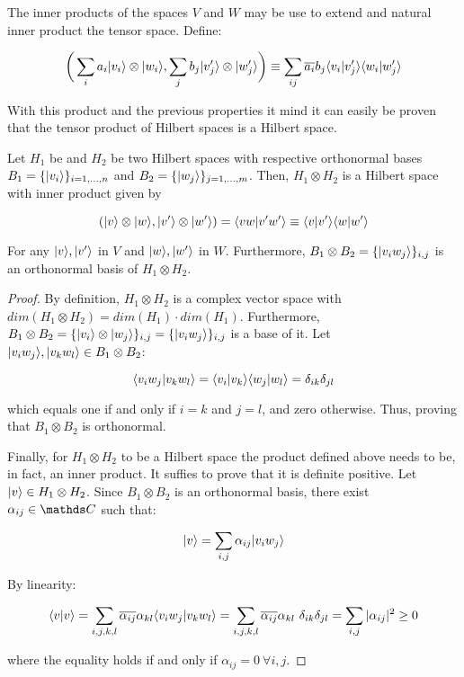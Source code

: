 The inner products of the spaces $V$ and $W$ may be use to extend and natural inner product the tensor space. Define:

$$ \bigg ( \sum_i a_i |v_i\rangle \otimes |w_i\rangle, \sum_j b_j |v_j'\rangle \otimes |w_j'\rangle \bigg ) \equiv
		\sum_{ij} \overline{a_i} b_j \langle v_i|v_j' \rangle \langle w_i|w_j' \rangle $$

With this product and the previous properties it mind it can easily be proven that the tensor product of Hilbert spaces is a Hilbert space.

\begin{proposition}
	Let $H_1$ be and $H_2$ be two Hilbert spaces with respective orthonormal bases $B_1 = \{|v_i\rangle\}_{i=1,\dots,n}$ and $B_2 = \{|w_j\rangle\}_{j=1,\dots,m}$. Then, $H_1 \otimes H_2$ is a Hilbert space with inner product given by
	
	$$ ( |v\rangle \otimes |w\rangle, |v'\rangle \otimes |w'\rangle) = \langle vw|v'w'\rangle \equiv \langle v|v'\rangle\langle w|w'\rangle $$
	
	For any $|v\rangle, |v'\rangle$ in $V$ and $|w\rangle, |w'\rangle$ in $W$. Furthermore, $B_1 \otimes B_2 = \{|v_i w_j\rangle\}_{i,j}$ is an orthonormal basis of $H_1 \otimes H_2$.
\end{proposition}

\begin{proof}
	By definition, $H_1 \otimes H_2$ is a complex vector space with $dim(H_1 \otimes H_2) = dim(H_1)\cdot dim(H_1)$. Furthermore, $B_1 \otimes B_2 = \{|v_i\rangle \otimes |w_j\rangle\}_{i,j} = \{|v_i w_j\rangle\}_{i,j}$ is a base of it. Let $|v_i w_j\rangle, |v_k w_l\rangle \in B_1 \otimes B_2$:
	
	$$ \langle v_i w_j|v_k w_l \rangle = \langle v_i|v_k \rangle \langle w_j|w_l \rangle = \delta_{ik} \delta_{jl} $$
	
	which equals one if and only if $i = k$ and $j = l$, and zero otherwise. Thus, proving that $B_1 \otimes B_2$ is orthonormal.
	
	Finally, for $H_1 \otimes H_2$ to be a Hilbert space the product defined above needs to be, in fact, an inner product. It suffies to prove that it is definite positive. Let $|v\rangle \in H_1 \otimes H_2$. Since $B_1 \otimes B_2$ is an orthonormal basis, there exist $\alpha_{ij} \in \C$ such that:
	
	$$ |v\rangle = \sum_{i,j} \alpha_{ij} |v_i w_j\rangle $$
	
	By linearity:
	
	$$ \langle v|v \rangle = \sum_{i,j,k,l} \overline{\alpha_{ij}} \alpha_{kl} \langle v_i w_j|v_k w_l \rangle = \sum_{i,j,k,l} \overline{\alpha_{ij}} \alpha_{kl} \  \delta_{ik} \delta_{jl} = \sum_{i,j} |\alpha_{ij}|^2  \geq 0 $$
	
	where the equality holds if and only if $\alpha_{ij} = 0 \ \forall i,j$.
\end{proof}

